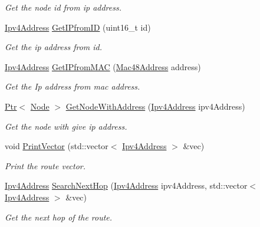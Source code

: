 \begin{DoxyCompactItemize}
\begin{DoxyCompactList}\small\item\em Get the node id from ip address. \end{DoxyCompactList}\item 
\hyperlink{classns3_1_1Ipv4Address}{Ipv4\+Address} \hyperlink{classns3_1_1dsr_1_1DsrRouting_abaf6e655b3bf50d3002c3739409d23a6}{Get\+I\+Pfrom\+ID} (uint16\+\_\+t id)
\begin{DoxyCompactList}\small\item\em Get the ip address from id. \end{DoxyCompactList}\item 
\hyperlink{classns3_1_1Ipv4Address}{Ipv4\+Address} \hyperlink{classns3_1_1dsr_1_1DsrRouting_a5914e79eec0e5e33be08f55321e8aaea}{Get\+I\+Pfrom\+M\+AC} (\hyperlink{classns3_1_1Mac48Address}{Mac48\+Address} address)
\begin{DoxyCompactList}\small\item\em Get the Ip address from mac address. \end{DoxyCompactList}\item 
\hyperlink{classns3_1_1Ptr}{Ptr}$<$ \hyperlink{classns3_1_1Node}{Node} $>$ \hyperlink{classns3_1_1dsr_1_1DsrRouting_aa301f5bb9481fe5392297015328e6332}{Get\+Node\+With\+Address} (\hyperlink{classns3_1_1Ipv4Address}{Ipv4\+Address} ipv4\+Address)
\begin{DoxyCompactList}\small\item\em Get the node with give ip address. \end{DoxyCompactList}\item 
void \hyperlink{classns3_1_1dsr_1_1DsrRouting_a21eda9cea85649375aed0a4b5f0c4c10}{Print\+Vector} (std\+::vector$<$ \hyperlink{classns3_1_1Ipv4Address}{Ipv4\+Address} $>$ \&vec)
\begin{DoxyCompactList}\small\item\em Print the route vector. \end{DoxyCompactList}\item 
\hyperlink{classns3_1_1Ipv4Address}{Ipv4\+Address} \hyperlink{classns3_1_1dsr_1_1DsrRouting_aa1b16658c14499af76ca7dd69c034f22}{Search\+Next\+Hop} (\hyperlink{classns3_1_1Ipv4Address}{Ipv4\+Address} ipv4\+Address, std\+::vector$<$ \hyperlink{classns3_1_1Ipv4Address}{Ipv4\+Address} $>$ \&vec)
\begin{DoxyCompactList}\small\item\em Get the next hop of the route. \end{DoxyCompactList}\item 

\end{DoxyCompactItemize}
